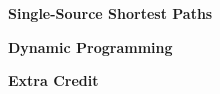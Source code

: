 \documentclass[12pt,twoside]{article}
\begin{document}

{\large 
\textbf{Single-Source Shortest Paths}}
\begin{problems}

\problem  %

\problem  %

\problem  %

{\large 
\textbf{Dynamic Programming}}
\problem  %

\problem  %


\problem  %

\problem

{\large 
\textbf{Extra Credit}}
\problem  %

\problem %

\end{problems}
\end{document}
